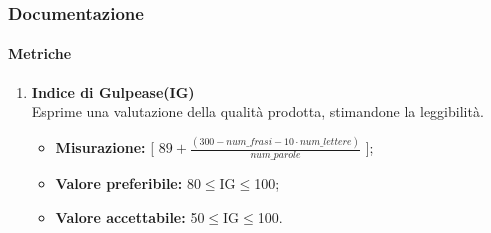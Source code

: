 	\subsubsection{Documentazione}
		\paragraph{Metriche} 
		\begin{enumerate}
		\item[]
			\textbf{Indice di Gulpease(IG)}\\
			Esprime una valutazione della qualità prodotta, stimandone la leggibilità.
			\begin{itemize}
				\item \textbf{Misurazione:} [ $89+ \frac{(300-num\_frasi-10\cdot num\_lettere)}{num\_parole}$ ];
				\item \textbf{Valore preferibile:} 80$\leq$IG$\leq$100;
				\item \textbf{Valore accettabile:} 50$\leq$IG$\leq$100.
			\end{itemize}
		\end{enumerate}
\pagebreak
